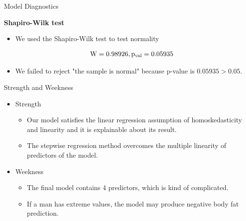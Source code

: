 \documentclass{beamer}
\begin{document}
\begin{frame}{Model Diagnostics}
\begin{flushleft}
\textbf{Shapiro-Wilk test}
\end{flushleft}
\begin{itemize}
\item We used the Shapiro-Wilk test to test normality 

$$
\rm W=0.98926, p_{val}=0.05935
$$

\item We failed to reject "the sample is normal" because p-value is $0.05935>  0.05$. 
\end{itemize}

\end{frame}

\begin{frame}{Strength and Weekness}
\begin{itemize}
\item Strength
\begin{itemize}
\item Our model satisfies the linear regression assumption of homoskedasticity and linearity and it is explainable about its result.
\item The stepwise regression method overcomes the multiple linearity of predictors of the model.
\end{itemize}
\item Weekness
\begin{itemize}
\item The final model contains 4 predictors, which is kind of complicated.
\item If a man has extreme values, the model may produce negative body fat prediction.
\end{itemize}
\end{itemize}
\end{frame}
\end{document}
